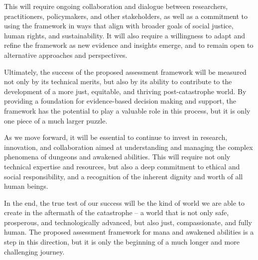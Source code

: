 \documentclass[12pt, a4paper]{article}
\begin{document}
This will require ongoing collaboration and dialogue between researchers, practitioners, policymakers, and other stakeholders, as well as a commitment to using the framework in ways that align with broader goals of social justice, human rights, and sustainability. It will also require a willingness to adapt and refine the framework as new evidence and insights emerge, and to remain open to alternative approaches and perspectives.

Ultimately, the success of the proposed assessment framework will be measured not only by its technical merits, but also by its ability to contribute to the development of a more just, equitable, and thriving post-catastrophe world. By providing a foundation for evidence-based decision making and support, the framework has the potential to play a valuable role in this process, but it is only one piece of a much larger puzzle.

As we move forward, it will be essential to continue to invest in research, innovation, and collaboration aimed at understanding and managing the complex phenomena of dungeons and awakened abilities. This will require not only technical expertise and resources, but also a deep commitment to ethical and social responsibility, and a recognition of the inherent dignity and worth of all human beings.

In the end, the true test of our success will be the kind of world we are able to create in the aftermath of the catastrophe – a world that is not only safe, prosperous, and technologically advanced, but also just, compassionate, and fully human. The proposed assessment framework for mana and awakened abilities is a step in this direction, but it is only the beginning of a much longer and more challenging journey.



\end{document}
